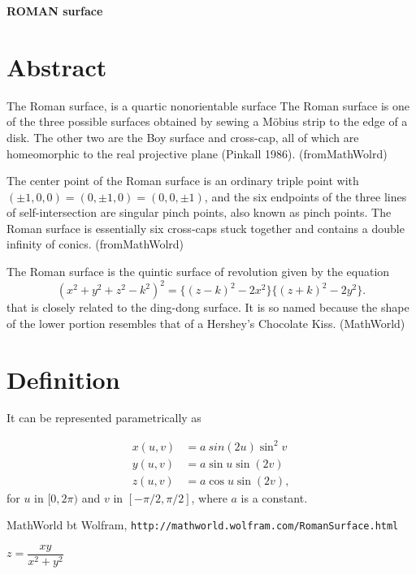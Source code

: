 \documentclass[12pt,dvipdfmx]{article}
\begin{document}
\begin{center}

{\bf \Large ROMAN surface}

\end{center}


\section{Abstract}

The Roman surface, is a quartic nonorientable surface The Roman surface is one of the three possible surfaces obtained by sewing a Möbius strip to the edge of a disk. The other two are the Boy surface and cross-cap, all of which are homeomorphic to the real projective plane (Pinkall 1986). (fromMathWolrd)

The center point of the Roman surface is an ordinary triple point with $(\pm1,0,0)=(0, \pm 1,0)=(0,0, \pm 1)$, and the six endpoints of the three lines of self-intersection are singular pinch points, also known as pinch points. The Roman surface is essentially six cross-caps stuck together and contains a double infinity of conics. (fromMathWolrd)


The Roman surface is the quintic surface of revolution given by the equation
\[
 (x^2+y^2+z^2-k^2)^2=\{(z-k)^2-2x^2\}\{(z+k)^2-2y^2\}.  	
\]
that is closely related to the ding-dong surface. It is so named because the shape of the lower portion resembles that of a Hershey's Chocolate Kiss. (MathWorld)

\section{Definition}

It can be represented parametrically as

\begin{align*}
x(u,v)	&=	a\ sin(2u) \sin^2v	\\ 
y(u,v)	&=	a\sin u \sin(2v)	\\
z(u,v)	&=	a\cos u \sin(2v),
\end{align*}
for $u$ in $[0,2\pi)$ and $v$ in $[-\pi/2,\pi/2]$, where $a$ is a constant.


\begin{thebibliography}{9}

 MathWorld bt Wolfram, \verb|http://mathworld.wolfram.com/RomanSurface.html|


\end{thebibliography}

\newpage

{\Huge $z=\dfrac{xy}{x^2+y^2}$}
\end{document}
